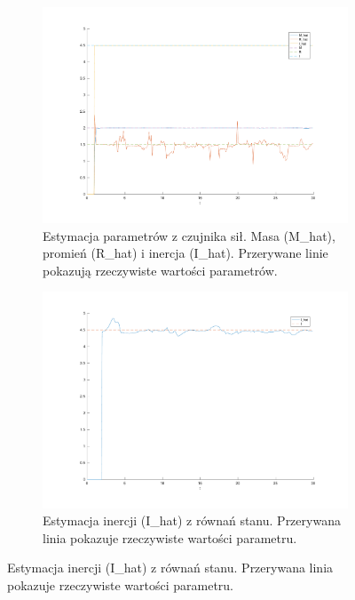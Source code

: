 \documentclass[a4paper, 10pt]{article}
\begin{document}
\begin{figure}
\begin{subfigure}{.5\textwidth}
		\includegraphics[width=\linewidth]{kompensacja_c}
		\caption{Estymacja parametrów z czujnika sił. Masa (M\_hat), promień (R\_hat) i inercja (I\_hat). Przerywane linie pokazują rzeczywiste wartości parametrów.}
		\label{fig:kompensacja_c}
	\end{subfigure}%
	\begin{subfigure}{.5\textwidth}
		\centering
		\includegraphics[width=\linewidth]{kompensacja_r}
		\caption{Estymacja inercji (I\_hat) z równań stanu. Przerywana linia pokazuje rzeczywiste wartości parametru.}
		\label{fig:kompensacja_r}
	\end{subfigure}
	

\end{figure}
\end{document}
